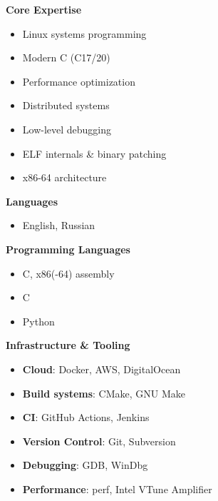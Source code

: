 \documentclass[12pt]{article}
\newcommand\CXX{C\nolinebreak[4]\hspace{-.05em}\raisebox{.4ex}{\relsize{-3}{\textbf{++}}}}
\newcommand\CvBigSkipLength{1em}
\newcommand\CvSkip[1]{\vspace{#1}}
\newcommand\CvBigSkip{\CvSkip{\CvBigSkipLength}}
\newcommand\CvSectionHeader[1]{\CvBigSkip\textbf{#1}\CvBigSkip}
\begin{document}
\begin{minipage}[t]{.5\linewidth}
  \CvSectionHeader{Core Expertise}

  \begin{itemize}
    \item Linux systems programming
    \item Modern {\CXX} ({\CXX}17/20)
    \item Performance optimization
    \item Distributed systems
    \item Low-level debugging
    \item ELF internals \& binary patching
    \item x86-64 architecture
  \end{itemize}

  \CvSectionHeader{Languages}

  \begin{itemize}
    \item English, Russian
  \end{itemize}

\end{minipage}%
\begin{minipage}[t]{.5\linewidth}
  \CvSectionHeader{Programming Languages}

  \begin{itemize}
    \item C, x86(-64) assembly
    \item \CXX
    \item Python
  \end{itemize}

  \CvSectionHeader{Infrastructure \& Tooling}

  \begin{itemize}
    \item \textbf{Cloud}: Docker, AWS, DigitalOcean
    \item \textbf{Build systems}: CMake, GNU Make
    \item \textbf{CI}: GitHub Actions, Jenkins
    \item \textbf{Version Control}: Git, Subversion
    \item \textbf{Debugging}: GDB, WinDbg
    \item \textbf{Performance}: perf, Intel VTune Amplifier
  \end{itemize}
\end{minipage}

\thispagestyle{fancy}
\end{document}
